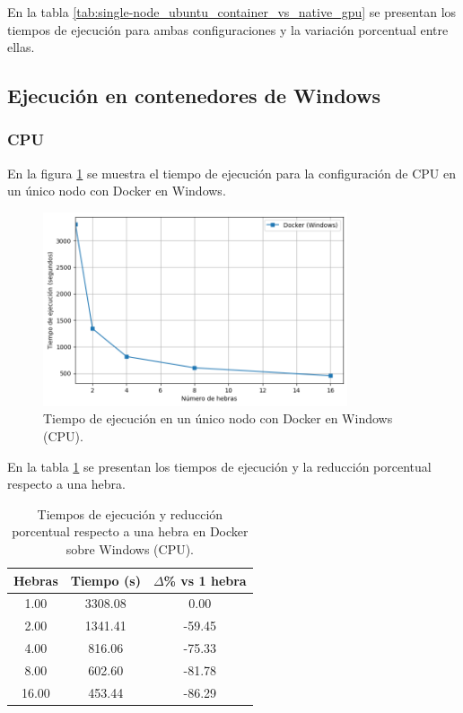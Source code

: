 En la tabla \ref{tab:single-node_ubuntu_container_vs_native_gpu} se presentan los tiempos de ejecución para ambas configuraciones y la variación porcentual entre ellas.

\subsection{Ejecución en contenedores de Windows}
\subsubsection{CPU}

En la figura \ref{fig:single-node_windows_docker_time} se muestra el tiempo de ejecución para la configuración de CPU en un único nodo con Docker en Windows.

\begin{figure}[H]
    \centering
    \includegraphics[width=0.8\textwidth]{imagenes/cap5/single-node_windows_docker_time.png}
    \caption{Tiempo de ejecución en un único nodo con Docker en Windows (CPU).}
    \label{fig:single-node_windows_docker_time}
\end{figure}

En la tabla \ref{tab:single-node_windows_docker_time} se presentan los tiempos de ejecución y la reducción porcentual respecto a una hebra.

\begin{table}[ht]
    \centering
    \begin{tabular}{|c|c|c|}
        \hline
        \textbf{Hebras} & \textbf{Tiempo (s)} & \textbf{$\Delta$\% vs 1 hebra} \\
        \hline
        1.00            & 3308.08             & 0.00                           \\
        2.00            & 1341.41             & -59.45                         \\
        4.00            & 816.06              & -75.33                         \\
        8.00            & 602.60              & -81.78                         \\
        16.00           & 453.44              & -86.29                         \\
        \hline
    \end{tabular}
    \caption{Tiempos de ejecución y reducción porcentual respecto a una hebra en Docker sobre Windows (CPU).}
    \label{tab:single-node_windows_docker_time}
\end{table}


